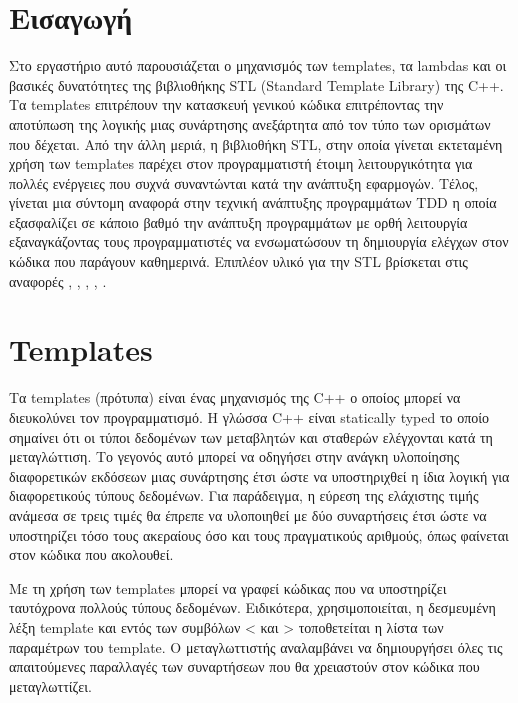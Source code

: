 \section{Εισαγωγή}
Στο εργαστήριο αυτό παρουσιάζεται ο μηχανισμός των templates, τα lambdas και οι βασικές δυνατότητες της βιβλιοθήκης STL (Standard Template Library) της C++. Τα templates επιτρέπουν την κατασκευή γενικού κώδικα επιτρέποντας την αποτύπωση της λογικής μιας συνάρτησης ανεξάρτητα από τον τύπο των ορισμάτων που δέχεται. Από την άλλη μεριά, η βιβλιοθήκη STL, στην οποία γίνεται εκτεταμένη χρήση των templates παρέχει στον προγραμματιστή έτοιμη λειτουργικότητα για πολλές ενέργειες που συχνά συναντώνται κατά την ανάπτυξη εφαρμογών. Τέλος, γίνεται μια σύντομη αναφορά στην τεχνική ανάπτυξης προγραμμάτων TDD η οποία εξασφαλίζει σε κάποιο βαθμό την ανάπτυξη προγραμμάτων με ορθή λειτουργία εξαναγκάζοντας τους προγραμματιστές να ενσωματώσουν τη δημιουργία ελέγχων στον κώδικα που παράγουν καθημερινά. Επιπλέον υλικό για την STL βρίσκεται στις αναφορές \cite{stamatiadis2017}, \cite{geeks4geeks_stl}, \cite{topcoder_stl1}, \cite{topcoder_stl2}, \cite{hackerearth_stl}. 


\section{Templates}
Τα templates (πρότυπα) είναι ένας μηχανισμός της C++ ο οποίος μπορεί να διευκολύνει τον προγραμματισμό. Η γλώσσα C++ είναι statically typed το οποίο σημαίνει ότι οι τύποι δεδομένων των μεταβλητών και σταθερών ελέγχονται κατά τη μεταγλώττιση. Το γεγονός αυτό μπορεί να οδηγήσει στην ανάγκη υλοποίησης διαφορετικών εκδόσεων μιας συνάρτησης έτσι ώστε να υποστηριχθεί η ίδια λογική για διαφορετικούς τύπους δεδομένων. Για παράδειγμα, η εύρεση της ελάχιστης τιμής ανάμεσα σε τρεις τιμές θα έπρεπε να υλοποιηθεί με δύο συναρτήσεις έτσι ώστε να υποστηρίζει τόσο τους ακεραίους όσο και τους πραγματικούς αριθμούς, όπως φαίνεται στον κώδικα που ακολουθεί.





Με τη χρήση των templates μπορεί να γραφεί κώδικας που να υποστηρίζει ταυτόχρονα πολλούς τύπους δεδομένων.  Ειδικότερα, χρησιμοποιείται, η δεσμευμένη λέξη template και εντός των συμβόλων < και > τοποθετείται η λίστα των παραμέτρων του template. Ο μεταγλωττιστής αναλαμβάνει να δημιουργήσει όλες τις απαιτούμενες παραλλαγές των συναρτήσεων που θα χρειαστούν στον κώδικα που μεταγλωττίζει.


